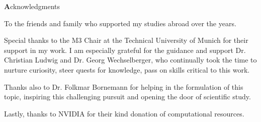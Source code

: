 \clearemptydoublepage
{}
{}



\vspace*{2cm}

\begin{center}
{\Large \textbf Acknowledgments}
\end{center}

\vspace{1cm}



\begin{center}
To the friends and family who supported my studies abroad over the years.
\newline
\newline

Special thanks to the M3 Chair at the Technical University of Munich for their support in my work.
I am especially grateful for the guidance and support Dr. Christian Ludwig and Dr. Georg Wechselberger,
who continually took the time to nurture curiosity, steer quests for knowledge,
pass on skills critical to this work.
\newline
\newline

Thanks also to Dr. Folkmar Bornemann for helping in the formulation of this topic,
inspiring this challenging pursuit and opening the door of scientific study.
\newline
\newline
\newline

Lastly, thanks to NVIDIA for their kind donation of computational resources.
\end{center}
